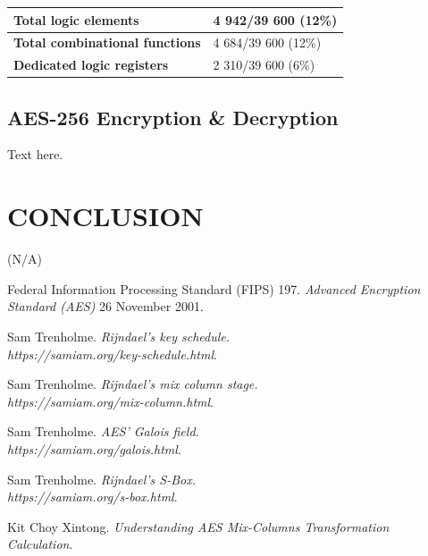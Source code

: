 \documentclass[a4paper, 10pt]{article}
\begin{document}
\begin{multicols}{2}
	\noindent
	\begin{center}
		\label{tab:keyexpansion}
                    \begin{tabular}{| m{5.5cm} | m{3cm} |}
		\hline   
		\textbf{Total logic elements} & 4 942/39 600 (12\%)\\
                        \hline
                        \textbf{Total combinational functions} & 4 684/39 600 (12\%)\\
                        \hline
                        \textbf{Dedicated logic registers} & 2 310/39 600 (6\%)\\
                        \hline
                    \end{tabular}
	\end{center}

        \subsection{AES-256 Encryption \& Decryption}

        Text here.

        \section{CONCLUSION}

        (N/A)

        \begin{thebibliography}{3}
            Federal Information Processing Standard (FIPS) 197.
            \textit{Advanced Encryption Standard (AES)}
            26 November 2001.

            Sam Trenholme.
            \textit{Rijndael's key schedule.\\https://samiam.org/key-schedule.html}.

            Sam Trenholme.
            \textit{Rijndael's mix column stage.\\https://samiam.org/mix-column.html}.

            Sam Trenholme.
            \textit{AES' Galois field.\\https://samiam.org/galois.html}.

            Sam Trenholme.
            \textit{Rijndael's S-Box.\\https://samiam.org/s-box.html}.

            Kit Choy Xintong.
            \textit{Understanding AES Mix-Columns Transformation Calculation}.
        \end{thebibliography}

    \end{multicols}
\end{document}

